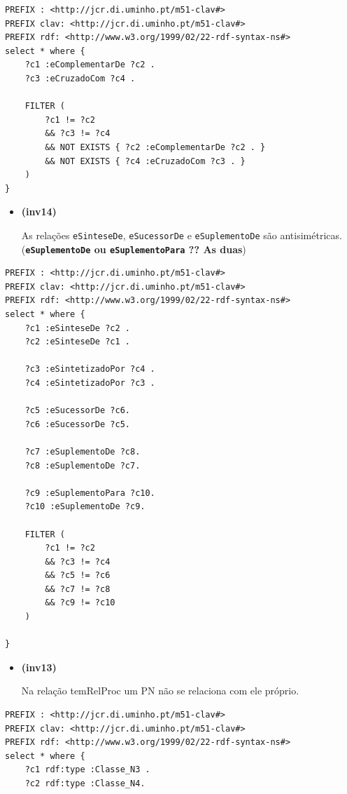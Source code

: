 \documentclass[tikz,runningheads,a4paper]{llncs}
\begin{document}
\begin{subappendices}
\begin{lstlisting}[language=sparql, frame=single, basicstyle=\scriptsize]
PREFIX : <http://jcr.di.uminho.pt/m51-clav#>
PREFIX clav: <http://jcr.di.uminho.pt/m51-clav#>
PREFIX rdf: <http://www.w3.org/1999/02/22-rdf-syntax-ns#>
select * where {
    ?c1 :eComplementarDe ?c2 .
    ?c3 :eCruzadoCom ?c4 .

    FILTER (
        ?c1 != ?c2 
        && ?c3 != ?c4
        && NOT EXISTS { ?c2 :eComplementarDe ?c2 . }
        && NOT EXISTS { ?c4 :eCruzadoCom ?c3 . }
    )
}
\end{lstlisting}

\begin{itemize}
\tightlist
\item
  \hypertarget{inv14}{\textbf{(inv14)}} As relações \texttt{eSinteseDe}, \texttt{eSucessorDe}
  e \texttt{eSuplementoDe} são antisimétricas.
  (\textbf{\texttt{eSuplementoDe} ou \texttt{eSuplementoPara} ?? As
  duas})
\end{itemize}

\begin{lstlisting}[language=sparql, frame=single, basicstyle=\scriptsize]
PREFIX : <http://jcr.di.uminho.pt/m51-clav#>
PREFIX clav: <http://jcr.di.uminho.pt/m51-clav#>
PREFIX rdf: <http://www.w3.org/1999/02/22-rdf-syntax-ns#>
select * where {
    ?c1 :eSinteseDe ?c2 .
    ?c2 :eSinteseDe ?c1 .

    ?c3 :eSintetizadoPor ?c4 .
    ?c4 :eSintetizadoPor ?c3 .

    ?c5 :eSucessorDe ?c6.
    ?c6 :eSucessorDe ?c5.

    ?c7 :eSuplementoDe ?c8.
    ?c8 :eSuplementoDe ?c7.

    ?c9 :eSuplementoPara ?c10.
    ?c10 :eSuplementoDe ?c9.

    FILTER (
        ?c1 != ?c2
        && ?c3 != ?c4
        && ?c5 != ?c6
        && ?c7 != ?c8
        && ?c9 != ?c10
    )

}
\end{lstlisting}

\begin{itemize}
\tightlist
\item
  \hypertarget{inv13}{\textbf{(inv13)}} Na relação temRelProc um PN não se relaciona com ele
  próprio.
\end{itemize}

\begin{lstlisting}[language=sparql, frame=single, basicstyle=\scriptsize]
PREFIX : <http://jcr.di.uminho.pt/m51-clav#>
PREFIX clav: <http://jcr.di.uminho.pt/m51-clav#>
PREFIX rdf: <http://www.w3.org/1999/02/22-rdf-syntax-ns#>
select * where {
    ?c1 rdf:type :Classe_N3 .
    ?c2 rdf:type :Classe_N4.


\end{lstlisting}
\end{subappendices}
\end{document}
